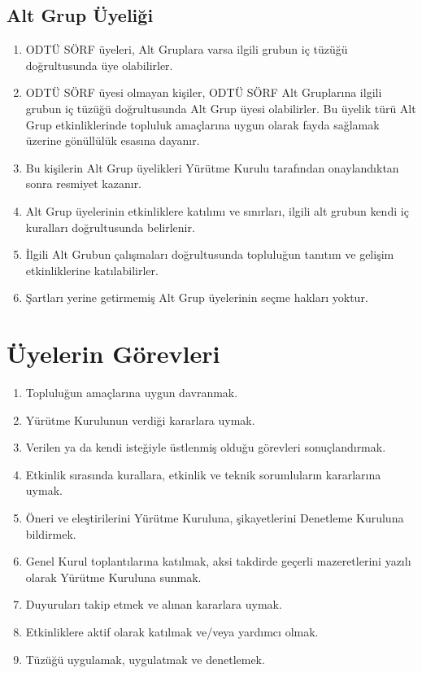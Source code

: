 \documentclass[11pt,a4paper]{article}
\begin{document}
\subsection{Alt Grup Üyeliği}
\begin{enumerate}
    \item ODTÜ SÖRF üyeleri, Alt Gruplara varsa ilgili grubun iç tüzüğü doğrultusunda üye olabilirler.
    \item ODTÜ SÖRF üyesi olmayan kişiler, ODTÜ SÖRF Alt Gruplarına ilgili grubun iç tüzüğü doğrultusunda Alt Grup üyesi olabilirler. Bu üyelik türü Alt Grup etkinliklerinde topluluk amaçlarına uygun olarak fayda sağlamak üzerine gönüllülük esasına dayanır.
    \item Bu kişilerin Alt Grup üyelikleri Yürütme Kurulu tarafından onaylandıktan sonra resmiyet kazanır.
    \item Alt Grup üyelerinin etkinliklere katılımı ve sınırları, ilgili alt grubun kendi iç kuralları doğrultusunda belirlenir.
    \item İlgili Alt Grubun çalışmaları doğrultusunda topluluğun tanıtım ve gelişim etkinliklerine katılabilirler.
    \item Şartları yerine getirmemiş Alt Grup üyelerinin seçme hakları yoktur.
\end{enumerate}

\section{Üyelerin Görevleri}
\begin{enumerate}
    \item Topluluğun amaçlarına uygun davranmak.
    \item Yürütme Kurulunun verdiği kararlara uymak.
    \item Verilen ya da kendi isteğiyle üstlenmiş olduğu görevleri sonuçlandırmak.
    \item Etkinlik sırasında kurallara, etkinlik ve teknik sorumluların kararlarına uymak.
    \item Öneri ve eleştirilerini Yürütme Kuruluna, şikayetlerini Denetleme Kuruluna bildirmek.
    \item Genel Kurul toplantılarına katılmak, aksi takdirde geçerli mazeretlerini yazılı olarak Yürütme Kuruluna sunmak.
    \item Duyuruları takip etmek ve alınan kararlara uymak.
    \item Etkinliklere aktif olarak katılmak ve/veya yardımcı olmak.
    \item Tüzüğü uygulamak, uygulatmak ve denetlemek.
\end{enumerate}
\end{document}
